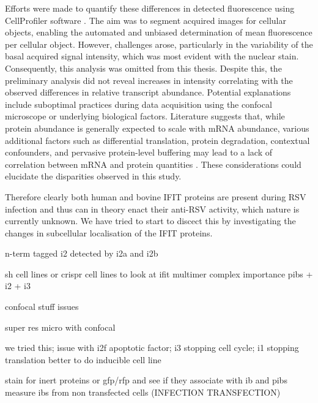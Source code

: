 Efforts were made to quantify these differences in detected fluorescence using CellProfiler software \cite{McQuin2018CellProfilerBiology}. The aim was to segment acquired images for cellular objects, enabling the automated and unbiased determination of mean fluorescence per cellular object. However, challenges arose, particularly in the variability of the basal acquired signal intensity,  which was most evident with the nuclear stain. Consequently, this analysis was omitted from this thesis. Despite this, the preliminary analysis did not reveal increases in intensity correlating with the observed differences in relative transcript abundance. Potential explanations include suboptimal practices during data acquisition using the confocal microscope or underlying biological factors. Literature suggests that, while protein abundance is generally expected to scale with mRNA abundance, various additional factors such as differential translation, protein degradation, contextual confounders, and pervasive protein-level buffering may lead to a lack of correlation between mRNA and protein quantities \cite{Liu2016OnAbundance, Buccitelli2020MRNAsControl}. These considerations could elucidate the disparities observed in this study.

Therefore clearly both human and bovine IFIT proteins are present during RSV infection and thus can in theory enact their anti-RSV activity, which nature is currently unknown. We have tried to start to discect this by investigating the changes in subcellular localisation of the IFIT proteins.



n-term tagged i2 detected by i2a and i2b

sh cell lines or crispr cell lines to look at ifit multimer complex importance
pibs + i2 + i3

confocal stuff issues

super res micro with confocal

we tried this; issue with i2f apoptotic factor; i3 stopping cell cycle; i1 stopping translation
better to do inducible cell line

stain for inert proteins or gfp/rfp and see if they associate with ib and pibs
measure ibs from non transfected cells (INFECTION TRANSFECTION)

